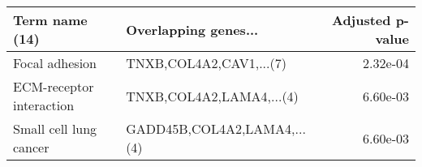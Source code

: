 \begin{tabular}{llr}
\toprule
          Term name (14) &        Overlapping genes... &  Adjusted p-value \\
\midrule
          Focal adhesion &     TNXB,COL4A2,CAV1,...(7) &          2.32e-04 \\
ECM-receptor interaction &    TNXB,COL4A2,LAMA4,...(4) &          6.60e-03 \\
  Small cell lung cancer & GADD45B,COL4A2,LAMA4,...(4) &          6.60e-03 \\
\bottomrule
\end{tabular}
